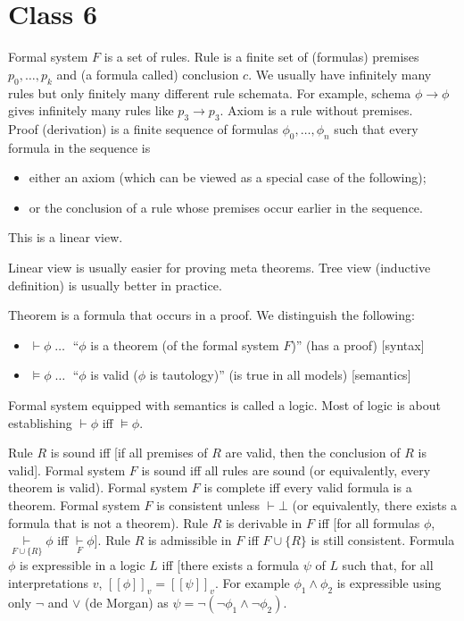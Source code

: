 {{%

\chapter{Class 6}

Formal system $F$ is a set of rules.
Rule is a finite set of (formulas) premises $p_0, \dots, p_k$ and (a formula called) conclusion $c$.
We usually have infinitely many rules but only finitely many different rule schemata.
For example, schema $\phi \rightarrow \phi$ gives infinitely many rules like $p_3 \rightarrow p_3$.
Axiom is a rule without premises.\bigskip\\
Proof (derivation) is a finite sequence of formulas $\phi_0, \dots, \phi_n$ such that every formula in the sequence is
\begin{itemize}
\item either an axiom (which can be viewed as a special case of the following);
\item or the conclusion of a rule whose premises occur earlier in the sequence.
\end{itemize}
This is a linear view.

Linear view is usually easier for proving meta theorems.
Tree view (inductive definition) is usually better in practice.

Theorem is a formula that occurs in a proof. We distinguish the following:
\begin{itemize}
\item $\vdash \phi \;\dots\;$ ``$\phi$ is a theorem (of the formal system $F$)'' (has a proof) [syntax]
\item $\vDash \phi \;\dots\;$ ``$\phi$ is valid ($\phi$ is tautology)'' (is true in all models) [semantics]
\end{itemize}
Formal system equipped with semantics is called a logic.
Most of logic is about establishing $\vdash \phi$ iff $\vDash \phi$.

Rule $R$ is sound iff [if all premises of $R$ are valid, then the conclusion of $R$ is valid].
Formal system $F$ is sound iff all rules are sound (or equivalently, every theorem is valid).
Formal system $F$ is complete iff every valid formula is a theorem.
Formal system $F$ is consistent unless $\vdash \bot$ (or equivalently, there exists a formula that is not a theorem).
Rule $R$ is derivable in $F$ iff [for all formulas $\phi$, $\underset{F \cup \{R\}}\vdash \phi$ iff $\underset{F}\vdash \phi$].
Rule $R$ is admissible in $F$ iff $F \cup \{R\}$ is still consistent.
Formula $\phi$ is expressible in a logic $L$ iff [there exists a formula $\psi$ of $L$ such that, for all interpretations $v$, $[[ \phi ]]_v = [[ \psi ]]_v$. %
For example $\phi_1 \wedge \phi_2$ is expressible using only $\neg$ and $\vee$ (de Morgan)
as $\psi = \neg(\neg\phi_1 \wedge \neg\phi_2)$.

}}
